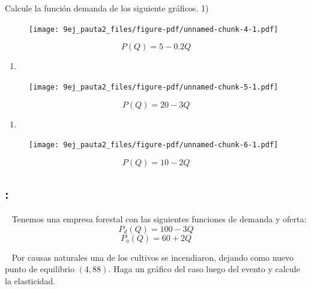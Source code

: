 \documentclass[
  letterpaper,
  DIV=11,
  numbers=noendperiod]{scrreport}
\providecommand{\tightlist}{%
  \setlength{\itemsep}{0pt}\setlength{\parskip}{0pt}}\usepackage{longtable,booktabs,array}
\begin{document}
Calcule la función demanda de los siguiente gráficos. 1)

\begin{figure}

{\centering \texttt{[image: 9ej\_pauta2\_files/figure-pdf/unnamed-chunk-4-1.pdf]}

}

\end{figure}

\[
P(Q)=5-0.2Q
\]

\newpage

\begin{enumerate}
\def\labelenumi{\arabic{enumi})}
\setcounter{enumi}{1}
\tightlist
\item
\end{enumerate}

\begin{figure}

{\centering \texttt{[image: 9ej\_pauta2\_files/figure-pdf/unnamed-chunk-5-1.pdf]}

}

\end{figure}

\[
P(Q)=20-3Q
\]

\newpage

\begin{enumerate}
\def\labelenumi{\arabic{enumi})}
\setcounter{enumi}{2}
\tightlist
\item
\end{enumerate}

\begin{figure}

{\centering \texttt{[image: 9ej\_pauta2\_files/figure-pdf/unnamed-chunk-6-1.pdf]}

}

\end{figure}

\[
P(Q)=10-2Q
\]

\hypertarget{section-28}{%
\subsection{:}\label{section-28}}

~ Tenemos una empresa forestal con las siguientes funciones de demanda y
oferta: \[
P_d(Q)=100-3Q
\] \[
P_o(Q)=60+2Q
\]

~ Por causas naturales una de los cultivos se incendiaron, dejando como
nuevo punto de equilibrio \((4,88)\). Haga un gráfico del caso luego del
evento y calcule la elasticidad.
\end{document}
